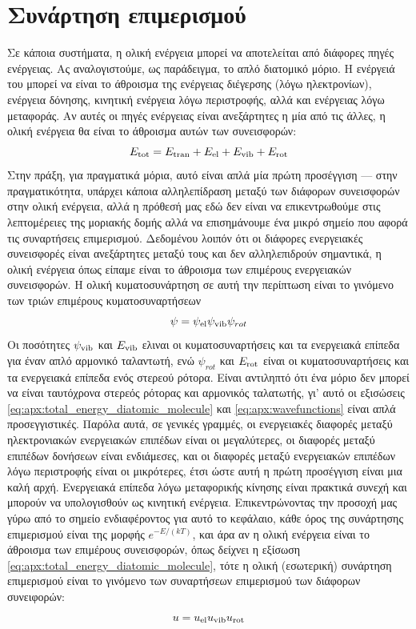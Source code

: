 \section{Συνάρτηση επιμερισμού}
Σε κάποια συστήματα, η ολική ενέργεια μπορεί να αποτελείται από διάφορες πηγές ενέργειας. Ας αναλογιστούμε, ως παράδειγμα, το απλό διατομικό μόριο. Η ενέργειά του μπορεί να είναι το άθροισμα της ενέργειας διέγερσης (λόγω ηλεκτρονίων), ενέργεια δόνησης, κινητική ενέργεια λόγω περιστροφής, αλλά και ενέργειας λόγω μεταφοράς. Αν αυτές οι πηγές ενέργειας είναι ανεξάρτητες η μία από τις άλλες, η ολική ενέργεια θα είναι το άθροισμα αυτών των συνεισφορών:
\begin{equation}
    \label{eq:apx:total_energy_diatomic_molecule}
    E_{\rm tot} = E_{\rm tran} + E_{\rm el} + E_{\rm vib} + E_{\rm rot}
\end{equation}
Στην πράξη, για πραγματικά μόρια, αυτό είναι απλά μία πρώτη προσέγγιση --- στην πραγματικότητα, υπάρχει κάποια αλληλεπίδραση μεταξύ των διάφορων συνεισφορών στην ολική ενέργεια, αλλά η πρόθεσή μας εδώ δεν είναι να επικεντρωθούμε στις λεπτομέρειες της μοριακής δομής αλλά να επισημάνουμε ένα μικρό σημείο που αφορά τις συναρτήσεις επιμερισμού. Δεδομένου λοιπόν ότι οι διάφορες ενεργειακές συνεισφορές είναι ανεξάρτητες μεταξύ τους και δεν αλληλεπιδρούν σημαντικά, η ολική ενέργεια όπως είπαμε είναι το άθροισμα των επιμέρους ενεργειακών συνεισφορών. Η ολική κυματοσυνάρτηση σε αυτή την περίπτωση είναι το γινόμενο των τριών επιμέρους κυματοσυναρτήσεων
\begin{equation}
    \label{eq:apx:wavefunctions}
    \psi = \psi_{\rm el} \psi_{\rm vib} \psi_{rot}
\end{equation}
Οι ποσότητες $\psi_{\rm vib}$ και $ E_{\rm vib}$ ελιναι οι κυματοσυναρτήσεις και τα ενεργειακά επίπεδα για έναν απλό αρμονικό ταλαντωτή, ενώ $\psi_{rot}$ και $E_{\rm rot}$ είναι οι κυματοσυναρτήσεις και τα ενεργειακά επίπεδα ενός στερεού ρότορα. Είναι αντιληπτό ότι ένα μόριο δεν μπορεί να είναι ταυτόχρονα στερεός ρότορας και αρμονικός ταλατωτής, γι' αυτό οι εξισώσεις \eqref{eq:apx:total_energy_diatomic_molecule} και \eqref{eq:apx:wavefunctions} είναι απλά προσεγγιστικές. Παρόλα αυτά, σε γενικές γραμμές, οι ενεργειακές διαφορές μεταξύ ηλεκτρονιακών ενεργειακών επιπέδων είναι οι μεγαλύτερες, οι διαφορές μεταξύ επιπέδων δονήσεων είναι ενδιάμεσες, και οι διαφορές μεταξύ ενεργειακών επιπέδων λόγω περιστροφής είναι οι μικρότερες, έτσι ώστε αυτή η πρώτη προσέγγιση είναι μια καλή αρχή. Ενεργειακά επίπεδα λόγω μεταφορικής κίνησης είναι πρακτικά συνεχή και μπορούν να υπολογισθούν ως κινητική ενέργεια. Επικεντρώνοντας την προσοχή μας γύρω από το σημείο ενδιαφέροντος για αυτό το κεφάλαιο, κάθε όρος της συνάρτησης επιμερισμού είναι της μορφής $e^{-E/(kT)}$, και άρα αν η ολική ενέργεια είναι το άθροισμα των επιμέρους συνεισφορών, όπως δείχνει η εξίσωση \eqref{eq:apx:total_energy_diatomic_molecule}, τότε η ολική (εσωτερική) συνάρτηση επιμερισμού είναι το γινόμενο των συναρτήσεων επιμερισμού των διάφορων συνειφορών:
\begin{equation}
    \label{eq:apx:total_partition_function}
    u = u_{\rm el} u_{\rm vib} u_{\rm rot}
\end{equation}

